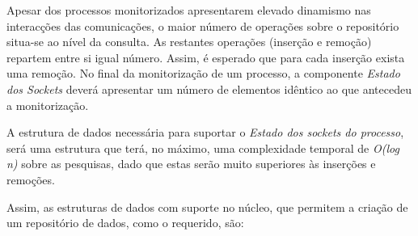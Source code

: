 Apesar dos processos monitorizados apresentarem elevado dinamismo nas interacções das comunicações, o maior número de operações sobre o repositório situa-se ao nível da consulta.
As restantes operações (inserção e remoção) repartem entre si igual número.
Assim, é esperado que para cada inserção exista uma remoção.
No final da monitorização de um processo, a componente \textit{Estado dos Sockets} deverá apresentar um número de elementos idêntico ao que antecedeu a monitorização.

A estrutura de dados necessária para suportar o \textit{Estado dos sockets do processo}, será uma estrutura que terá, no máximo, uma complexidade temporal de \textit{O(log n)} sobre as pesquisas, dado que estas serão muito superiores às inserções e remoções.

Assim, as estruturas de dados com suporte no núcleo, que permitem a criação de um repositório de dados, como o requerido, são:

